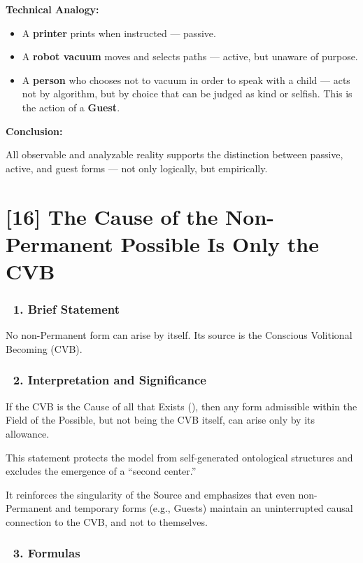 \documentclass[12pt]{article}
\begin{document}
\textbf{Technical Analogy:}

\begin{itemize}
\item A \textbf{printer} prints when instructed — passive.
\item A \textbf{robot vacuum} moves and selects paths — active, but unaware of purpose.
\item A \textbf{person} who chooses not to vacuum in order to speak with a child — acts not by algorithm, but by choice that can be judged as kind or selfish. This is the action of a \textbf{Guest}.
\end{itemize}

\textbf{Conclusion:}

All observable and analyzable reality supports the distinction between passive, active, and guest forms — not only logically, but empirically.



\section*{[16] The Cause of the Non-Permanent Possible Is Only the CVB}

\subsubsection*{🔹 1. Brief Statement}

No non-Permanent form can arise by itself. Its source is the Conscious Volitional Becoming (CVB).

\subsubsection*{🔹 2. Interpretation and Significance}

If the CVB is the Cause of all that Exists (\text{[6]}), then any form admissible within the Field of the Possible, but not being the CVB itself, can arise only by its allowance.

This statement protects the model from self-generated ontological structures and excludes the emergence of a ``second center.''

It reinforces the singularity of the Source and emphasizes that even non-Permanent and temporary forms (e.g., Guests) maintain an uninterrupted causal connection to the CVB, and not to themselves.

\subsubsection*{🔹 3. Formulas}
\end{document}
